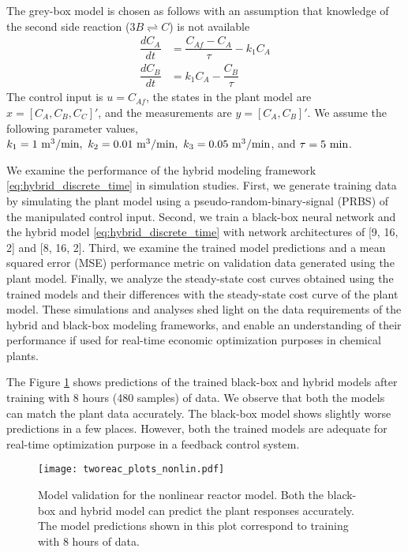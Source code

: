 \documentclass{article}
\begin{document}
The grey-box model is chosen as follows with an assumption that knowledge of the
second side reaction ($3B \rightleftharpoons C $) is not available
\begin{align*}
  \dfrac{dC_A}{dt} &= \dfrac{C_{Af} - C_A}{\tau} - k_1C_A\\
  \dfrac{dC_B}{dt} &= k_1C_A - \dfrac{C_B}{\tau}
\end{align*}
The control input is $u = C_{Af}$, the states in the plant model are $x = [C_A,
C_B, C_C]'$, and the measurements are $y = [C_A, C_B]'$. We assume the following
parameter values, $k_1 = 1 \ \textnormal{m}^3/\textnormal{min}, \ k_2 = 0.01 \
\textnormal{m}^3/\textnormal{min}, \ k_3 = 0.05 \
\textnormal{m}^3/\textnormal{min}$, and $\tau = 5 \ \textnormal{min}$.

We examine the performance of the hybrid modeling framework
\eqref{eq:hybrid_discrete_time} in simulation studies. First, we generate
training data by simulating the plant model using a pseudo-random-binary-signal
(PRBS) of the manipulated control input. Second, we train a black-box neural network
and the hybrid model \eqref{eq:hybrid_discrete_time} with network architectures
of [9, 16, 2] and [8, 16, 2]. Third, we examine the trained model predictions
and a mean squared error (MSE) performance metric on validation data generated
using the plant model. Finally, we analyze the steady-state cost curves obtained
using the trained models and their differences with the steady-state cost curve
of the plant model. These simulations and analyses shed light on the data
requirements of the hybrid and black-box modeling frameworks, and enable an
understanding of their performance if used for real-time economic optimization
purposes in chemical plants.

The Figure \ref{fig:validation_pred} shows predictions of the trained black-box
and hybrid models after training with 8 hours (480 samples) of data. We observe
that both the models can match the plant data accurately. The black-box model
shows slightly worse predictions in a few places. However, both the trained
models are adequate for real-time optimization purpose in a feedback control system.

\begin{figure}[!h]
  \centering
  \texttt{[image: tworeac\_plots\_nonlin.pdf]}
  \caption{Model validation for the nonlinear reactor model. Both the black-box
           and hybrid model can predict the plant responses accurately. The
           model predictions shown in this plot correspond to training with 8
           hours of data.}
  \label{fig:validation_pred}
\end{figure}
\end{document}
